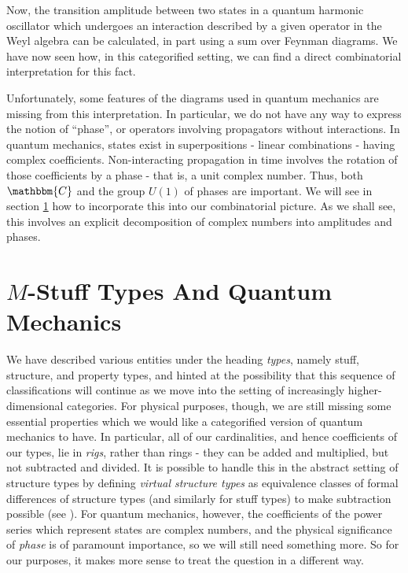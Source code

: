 \documentclass{amsart} \usepackage{amsmath,amssymb,bbm}
\begin{document}
Now, the transition amplitude between two states in a quantum harmonic
oscillator which undergoes an interaction described by a given
operator in the Weyl algebra can be calculated, in part using a sum
over Feynman diagrams.  We have now seen how, in this categorified
setting, we can find a direct combinatorial interpretation for this
fact.

Unfortunately, some features of the diagrams used in quantum mechanics
are missing from this interpretation.  In particular, we do not have
any way to express the notion of ``phase'', or operators involving
propagators without interactions.  In quantum mechanics, states exist
in superpositions - linear combinations - having complex coefficients.
Non-interacting propagation in time involves the rotation of those
coefficients by a phase - that is, a unit complex number.  Thus, both
$\mathbbm{C}$ and the group $U(1)$ of phases are important.  We will
see in section \ref{mstuff} how to incorporate this into our
combinatorial picture.  As we shall see, this involves an explicit
decomposition of complex numbers into amplitudes and phases.

\section{$M$-Stuff Types And Quantum Mechanics} \label{mstuff}

We have described various entities under the heading \textit{types},
namely stuff, structure, and property types, and hinted at the
possibility that this sequence of classifications will continue as we
move into the setting of increasingly higher-dimensional categories.
For physical purposes, though, we are still missing some essential
properties which we would like a categorified version of quantum
mechanics to have.  In particular, all of our cardinalities, and hence
coefficients of our types, lie in \textit{rigs}, rather than rings -
they can be added and multiplied, but not subtracted and divided.  It
is possible to handle this in the abstract setting of structure types
by defining \textit{virtual structure types} as
equivalence classes of formal differences of structure types (and
similarly for stuff types) to make subtraction possible (see {\cite{BLL}}).  For quantum
mechanics, however, the coefficients of the power series which
represent states are complex numbers, and the physical significance of
\textit{phase} is of paramount importance, so we will still need
something more.  So for our purposes, it makes more sense to treat the
question in a different way.
\end{document}
